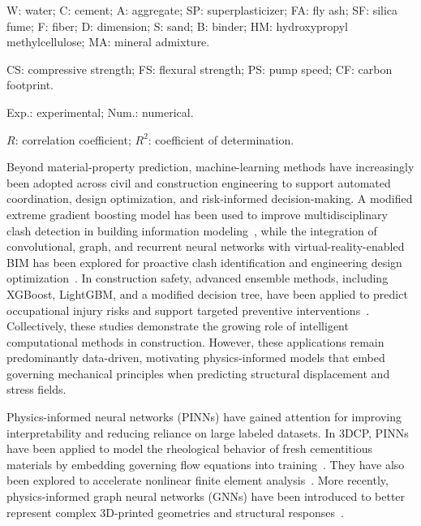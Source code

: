 \documentclass[review, authoryear, 12pt]{elsarticle}
\begin{document}
\begin{table}[!ht]
\begin{threeparttable}
\begin{tablenotes}
        W: water; C: cement; A: aggregate; SP: superplasticizer; FA: fly ash; SF: silica fume; F: fiber; D: dimension; S: sand; B: binder; HM: hydroxypropyl methylcellulose; MA: mineral admixture.

        CS: compressive strength; FS: flexural strength; PS: pump speed; CF: carbon footprint.

        Exp.: experimental; Num.: numerical.

        $R$: correlation coefficient; $R^2$: coefficient of determination.
        \end{tablenotes}
    \end{threeparttable}
\end{table}

Beyond material-property prediction, machine-learning methods have increasingly been adopted across civil and construction engineering to support automated coordination, design optimization, and risk-informed decision-making. A modified extreme gradient boosting model has been used to improve multidisciplinary clash detection in building information modeling~\citep{shehadeh_enhanced_2024}, while the integration of convolutional, graph, and recurrent neural networks with virtual-reality-enabled BIM has been explored for proactive clash identification and engineering design optimization~\citep{shehadeh_enhancing_2025}. In construction safety, advanced ensemble methods, including XGBoost, LightGBM, and a modified decision tree, have been applied to predict occupational injury risks and support targeted preventive interventions~\citep{shehadeh_enhancing_2025-1}. Collectively, these studies demonstrate the growing role of intelligent computational methods in construction. However, these applications remain predominantly data-driven, motivating physics-informed models that embed governing mechanical principles when predicting structural displacement and stress fields.

Physics-informed neural networks (PINNs) have gained attention for improving interpretability and reducing reliance on large labeled datasets. In 3DCP, PINNs have been applied to model the rheological behavior of fresh cementitious materials by embedding governing flow equations into training~\citep{zhang_rheologynet_2023, yan_physics-informed_2025, zhang_navierstokes-informed_2025}. They have also been explored to accelerate nonlinear finite element analysis~\citep{ekanayaka_modeling_2023}. More recently, physics-informed graph neural networks (GNNs) have been introduced to better represent complex 3D-printed geometries and structural responses~\citep{wang_physics-informed_2025}.
\end{document}
